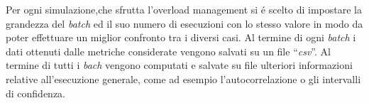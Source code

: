 Per ogni simulazione,che sfrutta l'overload management si \'e scelto di impostare la grandezza del \textit{batch} 
ed il suo numero di esecuzioni con lo stesso valore in modo da poter effettuare
un miglior confronto tra i diversi casi. Al termine di ogni \textit{batch} i dati 
ottenuti dalle metriche considerate vengono salvati su un file ``\textit{csv}''.
Al termine di tutti i \textit{bach} vengono computati e salvate su file ulteriori 
informazioni relative all'esecuzione generale, come ad esempio l'autocorrelazione o
gli intervalli di confidenza.
\begin{comment}
Per quanto riguarda le altre simulazioni non filtrate si è deciso di inserire lo stesso valore per lo \textit{START}, tra tutte le distribuzioni, ed analogamente per lo \textit{STOP}.
\end{comment}